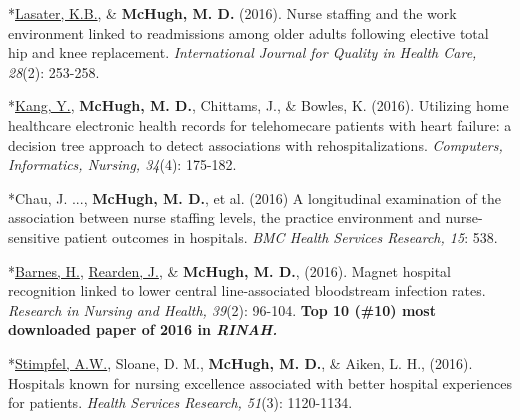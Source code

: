 \documentclass[10pt,]{article}
\begin{document}
{{{{{{{{{{{{{{{\begin{hangparas}{.25in}{1}
*{\underline {Lasater, K.B.}}, \& {\textbf {McHugh, M. D.}} (2016). Nurse staffing and the work environment linked to readmissions among older adults following elective total hip and knee replacement. {\textit {International Journal for Quality in Health Care, 28}}(2): 253-258.

\end{hangparas}



\begin{hangparas}{.25in}{1}

*{\underline {Kang, Y.}}, {\textbf {McHugh, M. D.}}, Chittams, J., \& Bowles, K. (2016). Utilizing home healthcare electronic health records for telehomecare patients with heart failure: a decision tree approach to detect associations with rehospitalizations. {\textit {Computers, Informatics, Nursing, 34}}(4): 175-182.

\end{hangparas}



\begin{hangparas}{.25in}{1}

*Chau, J. ..., {\textbf {McHugh, M. D.}}, et al. (2016) A longitudinal examination of the association between nurse staffing levels, the practice environment and nurse-sensitive patient outcomes in hospitals. {\textit {BMC Health Services Research, 15}}: 538.

\end{hangparas}



\begin{hangparas}{.25in}{1}

*{\underline {Barnes, H.}}, {\underline {Rearden, J.}}, \& {\textbf {McHugh, M. D.}}, (2016). Magnet hospital recognition linked to lower central line-associated bloodstream infection rates. {\textit {Research in Nursing and Health, 39}}(2): 96-104. {\textbf {Top 10 (\#10) most downloaded paper of 2016 in {\textit {RINAH.}}}}

\end{hangparas}



\begin{hangparas}{.25in}{1}

*{\underline {Stimpfel, A.W.}}, Sloane, D. M., {\textbf {McHugh, M. D.}}, \& Aiken, L. H., (2016). Hospitals known for nursing excellence associated with better hospital experiences for patients. {\textit {Health Services Research, 51}}(3): 1120-1134.


\end{hangparas}}}}}}}}}}}}}}}}
\end{document}
